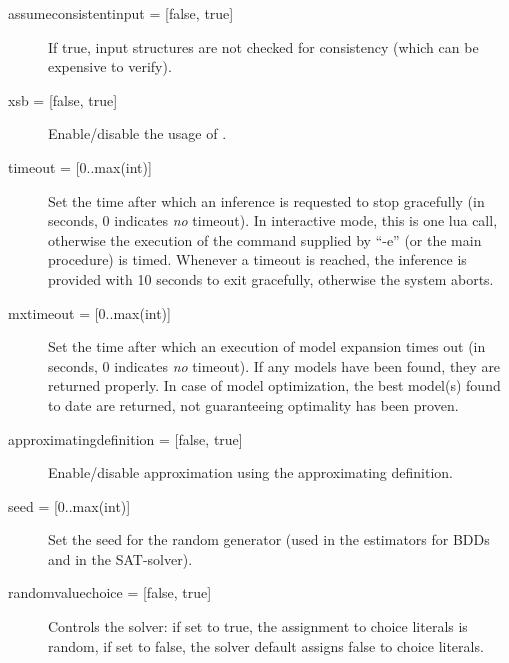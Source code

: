 \begin{description}
	\item[{assumeconsistentinput = [false, true]}] If true, input structures are not checked for consistency (which can be expensive to verify). 
	\item[{xsb = [false, true]}] Enable/disable the usage of \xsb.
	\item[{timeout = [0..max(int)]}] Set the time after which an inference is requested to stop gracefully (in seconds, 0 indicates \emph{no} timeout).
		In interactive mode, this is one lua call, otherwise the execution of the command supplied by ``-e'' (or the main procedure) is timed.
		Whenever a timeout is reached, the inference is provided with 10 seconds to exit gracefully, otherwise the system aborts.				
	\item[{mxtimeout = [0..max(int)]}] Set the time after which an execution of model expansion times out (in seconds, 0 indicates \emph{no} timeout).
		If any models have been found, they are returned properly.
		In case of model optimization, the best model(s) found to date are returned, not guaranteeing optimality has been proven. 
	\item[{approximatingdefinition = [false, true]}] Enable/disable approximation using the approximating definition.
	\item[{seed = [0..max(int)]}] Set the seed for the random generator (used in the estimators for BDDs and in the SAT-solver).
	\item[{randomvaluechoice = [false, true]}] Controls the solver: if set to true, the assignment to choice literals is random, if set to false, the solver default assigns false to choice literals.
\end{description}

